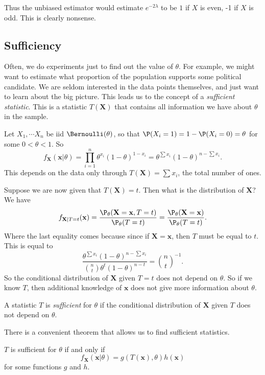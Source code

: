 \documentclass[a4paper]{article}
\begin{document}
Thus the unbiased estimator would estimate $e^{-2\lambda}$ to be $1$ if $X$ is even, -1 if $X$ is odd. This is clearly nonsense.
\subsection{Sufficiency}
Often, we do experiments just to find out the value of $\theta$. For example, we might want to estimate what proportion of the population supports some political candidate. We are seldom interested in the data points themselves, and just want to learn about the big picture. This leads us to the concept of a \emph{sufficient statistic}. This is a statistic $T(\mathbf{X})$ that contains all information we have about $\theta$ in the sample.

\begin{eg}
  Let $X_1, \cdots X_n$ be iid $\Bernoulli(\theta)$, so that $\P(X_i = 1) = 1 - \P(X_i = 0) = \theta$ for some $0 < \theta < 1$. So
  \[
    f_{\mathbf{X}} (\mathbf{x}|\theta) = \prod_{i = 1}^n \theta^{x_i}(1 - \theta)^{1 - x_i} = \theta^{\sum x_i}(1 - \theta)^{n - \sum x_i}.
  \]
  This depends on the data only through $T(\mathbf{X}) = \sum x_i$, the total number of ones.

  Suppose we are now given that $T(\mathbf{X}) = t$. Then what is the distribution of $\mathbf{X}$? We have
  \[
    f_{\mathbf{X}|T = t}(\mathbf{x}) = \frac{\P_\theta(\mathbf{X} = \mathbf{x}, T = t)}{\P_\theta (T = t)} = \frac{\P_\theta(\mathbf{X} = \mathbf{x})}{\P_\theta(T = t)}.
  \]
  Where the last equality comes because since if $\mathbf{X} = \mathbf{x}$, then $T$ must be equal to $t$. This is equal to
  \[
    \frac{\theta^{\sum x_i}(1 - \theta)^{n - \sum x_i}}{\binom{n}{t}\theta^t (1 - \theta)^{n - t}} = \binom{n}{t}^{-1}.
  \]
  So the conditional distribution of $\mathbf{X}$ given $T = t$ does not depend on $\theta$. So if we know $T$, then additional knowledge of $\mathbf{x}$ does not give more information about $\theta$.
\end{eg}

\begin{defi}
  A statistic $T$ is \emph{sufficient} for $\theta$ if the conditional distribution of $\mathbf{X}$ given $T$ does not depend on $\theta$.
\end{defi}

There is a convenient theorem that allows us to find sufficient statistics.
\begin{thm}
  $T$ is sufficient for $\theta$ if and only if
  \[
    f_{\mathbf{X}}(\mathbf{x} |\theta) = g(T(\mathbf{x}), \theta)h(\mathbf{x})
  \]
  for some functions $g$ and $h$.
\end{thm}
\end{document}
